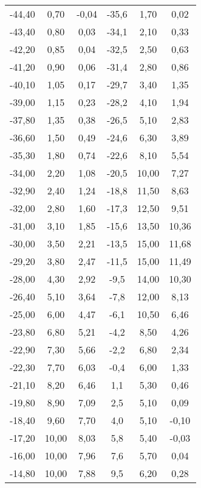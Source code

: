 \begin{table}[htp]
\begin{center}
\begin{tabular}{cccccc}
			-44,40 & 0,70 & -0,04 & -35,6 & 1,70 & 0,02\\
			-43,40 & 0,80 & 0,03  & -34,1 & 2,10 & 0,33\\
			-42,20 & 0,85 & 0,04  & -32,5 & 2,50 & 0,63\\
			-41,20 & 0,90 & 0,06  & -31,4 & 2,80 & 0,86\\
			-40,10 & 1,05 & 0,17  & -29,7 & 3,40 & 1,35\\
			-39,00 & 1,15 & 0,23  & -28,2 & 4,10 & 1,94\\
			-37,80 & 1,35 & 0,38  & -26,5 & 5,10 & 2,83\\
			-36,60 & 1,50 & 0,49  & -24,6 & 6,30 & 3,89\\
			-35,30 & 1,80 & 0,74  & -22,6 & 8,10 & 5,54\\
			-34,00 & 2,20 & 1,08  & -20,5 & 10,00 & 7,27\\
			-32,90 & 2,40 & 1,24  & -18,8 & 11,50 & 8,63\\
			-32,00 & 2,80 & 1,60  & -17,3 & 12,50 & 9,51\\
			-31,00 & 3,10 & 1,85  & -15,6 & 13,50 & 10,36\\
			-30,00 & 3,50 & 2,21  & -13,5 & 15,00 & 11,68\\
			-29,20 & 3,80 & 2,47  & -11,5 & 15,00 & 11,49\\
			-28,00 & 4,30 & 2,92  & -9,5  & 14,00 & 10,30\\
			-26,40 & 5,10 & 3,64  & -7,8  & 12,00 & 8,13\\
			-25,00 & 6,00 & 4,47  & -6,1  & 10,50 & 6,46\\
			-23,80 & 6,80 & 5,21  & -4,2  & 8,50 & 4,26\\
			-22,90 & 7,30 & 5,66  & -2,2  & 6,80 & 2,34\\
			-22,30 & 7,70 & 6,03  & -0,4  & 6,00 & 1,33\\
			-21,10 & 8,20 & 6,46  & 1,1 	& 5,30 & 0,46\\
			-19,80 & 8,90 & 7,09  & 2,5 	& 5,10 & 0,09\\
			-18,40 & 9,60 & 7,70  & 4,0 	& 5,10 & -0,10\\
			-17,20 & 10,00 & 8,03 & 5,8 	& 5,40 & -0,03\\
			-16,00 & 10,00 & 7,96 & 7,6 	& 5,70 & 0,04\\
			-14,80 & 10,00 & 7,88 & 9,5 	& 6,20 & 0,28\\
      \bottomrule
      \end{tabular}
    \end{center}
  \end{table}
